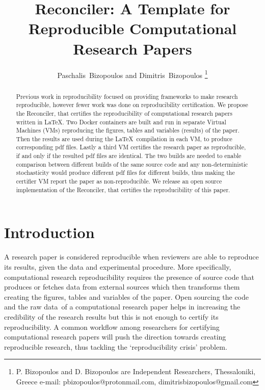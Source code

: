 \documentclass[journal]{IEEEtran}
\begin{document}

\title{Reconciler: A Template for Reproducible Computational Research Papers}

\author{Paschalis~Bizopoulos and Dimitris~Bizopoulos
\thanks{P. Bizopoulos and D. Bizopoulos are Independent Researchers, Thessaloniki, Greece e-mail: pbizopoulos@protonmail.com, dimitrisbizopoulos@gmail.com}}

\maketitle

\begin{abstract}
	Previous work in reproducibility focused on providing frameworks to make research reproducible, however fewer work was done on reproducibility certification.
	We propose the Reconciler, that certifies the reproducibility of computational research papers written in \LaTeX.
	Two Docker containers are built and run in separate Virtual Machines (VMs) reproducing the figures, tables and variables (results) of the paper.
	Then the results are used during the \LaTeX\ compilation in each VM, to produce corresponding pdf files.
	Lastly a third VM certifies the research paper as reproducible, if and only if the resulted pdf files are identical.
	The two builds are needed to enable comparison between different builds of the same source code and any non-deterministic stochasticity would produce different pdf files for different builds, thus making the certifier VM report the paper as non-reproducible.
	We release an open source implementation of the Reconciler, that certifies the reproducibility of this paper.
\end{abstract}

\section{Introduction}
A research paper is considered reproducible when reviewers are able to reproduce its results, given the data and experimental procedure.
More specifically, computational research reproducibility requires the presence of source code that produces or fetches data from external sources which then transforms them creating the figures, tables and variables of the paper.
Open sourcing the code and the raw data of a computational research paper helps in increasing the credibility of the research results but this is not enough to certify its reproducibility.
A common workflow among researchers for certifying computational research papers will push the direction towards creating reproducible research, thus tackling the `reproducibility crisis' problem.
\end{document}
